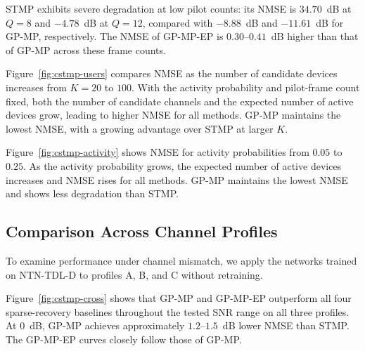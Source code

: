 STMP exhibits severe degradation at low pilot counts: its NMSE is
$34.70$~dB at $Q=8$ and $-4.78$~dB at $Q=12$, compared with
$-8.88$~dB and $-11.61$~dB for GP-MP, respectively.
The NMSE of GP-MP-EP is $0.30$--$0.41$~dB higher than that of
GP-MP across these frame counts.

Figure~\ref{fig:cstmp-users} compares NMSE as the number of candidate
devices increases from $K=20$ to $100$. With the activity probability
and pilot-frame count fixed, both the number of candidate channels and
the expected number of active devices grow, leading to higher NMSE
for all methods. GP-MP maintains the lowest NMSE, with a growing
advantage over STMP at larger $K$.

Figure~\ref{fig:cstmp-activity} shows NMSE for activity
probabilities from $0.05$ to $0.25$. As the activity probability grows,
the expected number of active devices increases and NMSE rises for
all methods. GP-MP maintains the lowest NMSE and shows less degradation
than STMP.

\subsection{Comparison Across Channel Profiles}
To examine performance under channel mismatch, we apply the networks
trained on NTN-TDL-D to profiles A, B, and C without retraining.

Figure~\ref{fig:cstmp-cross} shows that GP-MP and GP-MP-EP outperform
all four sparse-recovery baselines throughout the tested SNR range
on all three profiles. At $0$~dB, GP-MP achieves approximately
$1.2$--$1.5$~dB lower NMSE than STMP. The GP-MP-EP curves closely
follow those of GP-MP.
